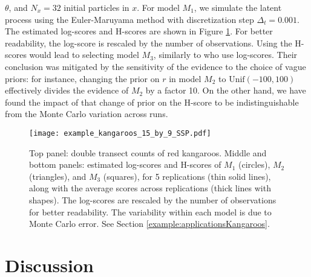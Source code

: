 \documentclass[12pt]{article}
\theoremstyle{plain}
\theoremstyle{definition}
\begin{document}
	$\theta$, and $N_x = 32$ initial particles in $x$.  For model
	$M_1$, we simulate the latent process using the Euler-Maruyama method with
	discretization step $\Delta_t=0.001$. The estimated log-scores and H-scores are shown in Figure
	\ref{fig:kangarooAllinOne}. For better readability, the log-score is rescaled by the number of observations. Using the H-scores would lead to selecting
	model $M_3$, similarly to \citet{knape2012} who use log-scores.  
	Their conclusion was mitigated by the sensitivity of the evidence to the choice of vague priors: for instance,
	changing the prior on $r$ in model $M_2$ to $\text{Unif}(-100,100)$ effectively divides the evidence of $M_2$ by a factor 10.
	On the other hand, we have found the impact of that change of prior on the H-score to be indistinguishable from the Monte Carlo variation
	across runs.
	
	\begin{figure}[h]
		\texttt{[image: example\_kangaroos\_15\_by\_9\_SSP.pdf]}
		\centering
		\caption{Top panel: double transect counts of red kangaroos. Middle and bottom panels: estimated log-scores and H-scores of $M_1$ (circles), $M_2$ (triangles), and $M_3$ (squares), for 5 replications (thin solid lines), along with the average scores across replications (thick lines with shapes). The log-scores are rescaled by the number of observations for better readability. The variability within each model is due to Monte Carlo error. See Section \ref{example:applicationsKangaroos}.}
		\label{fig:kangarooAllinOne}
	\end{figure}
	\section{Discussion}
	\label{sec:discussion}
	
\end{document}
